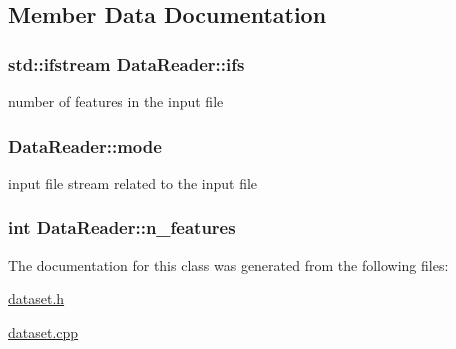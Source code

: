 \subsection{Member Data Documentation}
\hypertarget{class_data_reader_abbfd55937610f3cca1d34f21bcbcda0d}{
\subsubsection[{ifs}]{\setlength{\rightskip}{0pt plus 5cm}std\+::ifstream Data\+Reader\+::ifs\hspace{0.3cm}{\ttfamily [private]}}}\label{class_data_reader_abbfd55937610f3cca1d34f21bcbcda0d}
number of features in the input file \hypertarget{class_data_reader_a76f00afd1dd174c2f1ead09b88f5679f}{
\subsubsection[{mode}]{ Data\+Reader\+::mode\hspace{0.3cm}{\ttfamily [private]}}}\label{class_data_reader_a76f00afd1dd174c2f1ead09b88f5679f}
input file stream related to the input file \hypertarget{class_data_reader_a3d27a389f86383adf1b15d84b5ec5fa7}{
\subsubsection[{n\+\_\+features}]{\setlength{\rightskip}{0pt plus 5cm}int Data\+Reader\+::n\+\_\+features\hspace{0.3cm}{\ttfamily [private]}}}\label{class_data_reader_a3d27a389f86383adf1b15d84b5ec5fa7}


The documentation for this class was generated from the following files\+:\begin{DoxyCompactItemize}
\item 
\hyperlink{dataset_8h}{dataset.\+h}\item 
\hyperlink{dataset_8cpp}{dataset.\+cpp}\end{DoxyCompactItemize}
